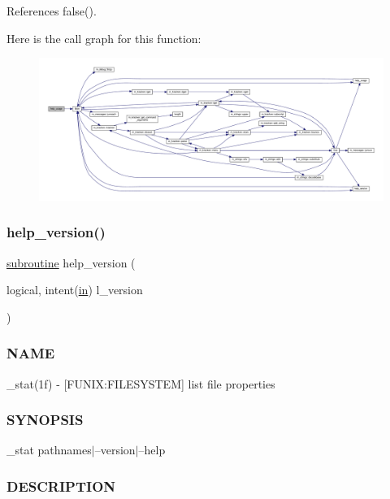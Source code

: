 References false().

Here is the call graph for this function\+:
\nopagebreak
\begin{figure}[H]
\begin{center}
\leavevmode
\includegraphics[width=350pt]{__stat_8f90_a3e09a3b52ee8fb04eeb93fe5761626a8_cgraph}
\end{center}
\end{figure}
\mbox{\label{__stat_8f90_a39c21619b08a3c22f19e2306efd7f766}} 
\subsubsection{\texorpdfstring{help\+\_\+version()}{help\_version()}}
{\footnotesize\ttfamily \hyperlink{M__stopwatch_83_8txt_acfbcff50169d691ff02d4a123ed70482}{subroutine} help\+\_\+version (\begin{DoxyParamCaption}\item[{logical, intent(\hyperlink{M__journal_83_8txt_afce72651d1eed785a2132bee863b2f38}{in})}]{l\+\_\+version }\end{DoxyParamCaption})}



\subsubsection*{N\+A\+ME}

\+\_\+stat(1f) -\/ \mbox{[}F\+U\+N\+IX\+:F\+I\+L\+E\+S\+Y\+S\+T\+EM\mbox{]} list file properties \subsubsection*{S\+Y\+N\+O\+P\+S\+IS}

\+\_\+stat pathnames$\vert$--version$\vert$--help \subsubsection*{D\+E\+S\+C\+R\+I\+P\+T\+I\+ON}

